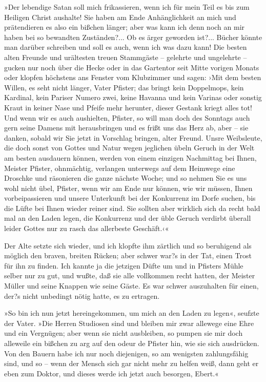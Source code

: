 »Der lebendige Satan soll mich frikassieren, wenn ich für mein Teil
es bis zum Heiligen Christ aushalte! Sie haben am Ende
Anhänglichkeit an mich und prätendieren es also ein bißchen länger;
aber was kann ich denn noch an mir haben bei so bewandten
Zuständen?... Ob es ärger geworden ist?... Bücher könnte man
darüber schreiben und soll es auch, wenn ich was dazu kann! Die
besten alten Freunde und urältesten treuen Stammgäste – gelehrte
und ungelehrte – gucken nur noch über die Hecke oder in das
Gartentor seit Mitte vorigen Monats oder klopfen höchstens ans
Fenster vom Klubzimmer und sagen: ›Mit dem besten Willen, es seht
nicht länger, Vater Pfister; das bringt kein Doppelmops, kein
Kardinal, kein Pariser Numero zwei, keine Havanna und kein Varinas
oder sonstig Kraut in keiner Nase und Pfeife mehr herunter, dieser
Gestank kriegt alles tot! Und wenn wir es auch aushielten, Pfister,
so will man doch des Sonntags auch gern seine Damens mit
herausbringen und es frißt uns das Herz ab, aber – sie danken,
sobald wir Sie jetzt in Vorschlag bringen, alter Freund. Unsre
Weibsleute, die doch sonst von Gottes und Natur wegen jeglichen
übeln Geruch in der Welt am besten ausdauern können, werden von
einem einzigen Nachmittag bei Ihnen, Meister Pfister, ohnmächtig,
verlangen unterwegs auf dem Heimwege eine Droschke und räsonieren
die ganze nächste Woche; und so nehmen Sie es uns wohl nicht übel,
Pfister, wenn wir am Ende nur können, wie wir müssen, Ihnen
vorbeipassieren und unsere Unterkunft bei der Konkurrenz im Dorfe
suchen, bis die Lüfte bei Ihnen wieder reiner sind. Sie sollten
aber wirklich sich da recht bald mal an den Laden legen, die
Konkurrenz und der üble Geruch verdirbt überall leider Gottes nur
zu rasch das allerbeste Geschäft.‹«

Der Alte setzte sich wieder, und ich klopfte ihm zärtlich und so
beruhigend als möglich den braven, breiten Rücken; aber schwer
war?s in der Tat, einen Trost für ihn zu finden. Ich kannte ja die
jetzigen Düfte um und in Pfisters Mühle selber nur zu gut, und
wußte, daß sie alle vollkommen recht hatten, der Meister Müller und
seine Knappen wie seine Gäste. Es war schwer auszuhalten für einen,
der?s nicht unbedingt nötig hatte, es zu ertragen.

»So bin ich nun jetzt hereingekommen, um mich an den Laden zu
legen«, seufzte der Vater. »Die Herren Studiosen sind und bleiben
mir zwar allewege eine Ehre und ein Vergnügen; aber wenn sie nicht
ausbleiben, so pumpen sie mir doch alleweile ein bißchen zu arg auf
den odeur de Pfister hin, wie sie sich ausdrücken. Von den Bauern
habe ich nur noch diejenigen, so am wenigsten zahlungsfähig sind,
und so – wenn der Mensch sich gar nicht mehr zu helfen weiß, dann
geht er eben zum Doktor, und dieses werde ich jetzt auch besorgen,
Ebert.«

